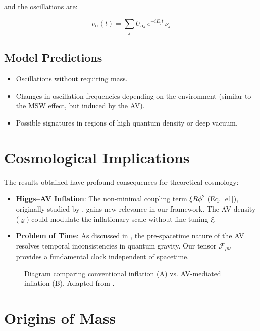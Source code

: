 \documentclass[twoside]{article}
\theoremstyle{definition}
\theoremstyle{remark}
\numberwithin{equation}{section}
\theoremstyle{definition}
\theoremstyle{example}
\theoremstyle{remark}
\numberwithin{equation}{section}%
\begin{document}
	and the oscillations are:
	
	\begin{equation}
		\nu_\alpha(t) = \sum_j U_{\alpha j} \, e^{-i E_j t} \, \nu_j
	\end{equation}
	
	\subsection{Model Predictions}
	
	\begin{itemize}
		\item Oscillations without requiring mass.
		\item Changes in oscillation frequencies depending on the environment (similar to the MSW effect, but induced by the AV).
		\item Possible signatures in regions of high quantum density or deep vacuum.
	\end{itemize}
	
		
	\section{Cosmological Implications}
	
	The results obtained have profound consequences for theoretical cosmology:
	
	\begin{itemize}
		\item \textbf{Higgs–AV Inflation}: The non-minimal coupling term $\xi R \phi^2$ (Eq. \ref{e1}), originally studied by \cite{Bezrukov2008}, gains new relevance in our framework. The AV density ($\varrho$) could modulate the inflationary scale without fine-tuning $\xi$.
		
		\item \textbf{Problem of Time}: As discussed in \cite{Anderson2012}, the pre-spacetime nature of the AV resolves temporal inconsistencies in quantum gravity. Our tensor $\mathcal{F}_{\mu\nu}$ provides a fundamental clock independent of spacetime.
	\end{itemize}
	
	\begin{figure}[H]
		\centering
		\caption{Diagram comparing conventional inflation (A) vs. AV-mediated inflation (B). Adapted from \cite{Bezrukov2008}.}
		\label{fig:inflation}
	\end{figure}
	
	\section{Origins of Mass}
\end{document}
